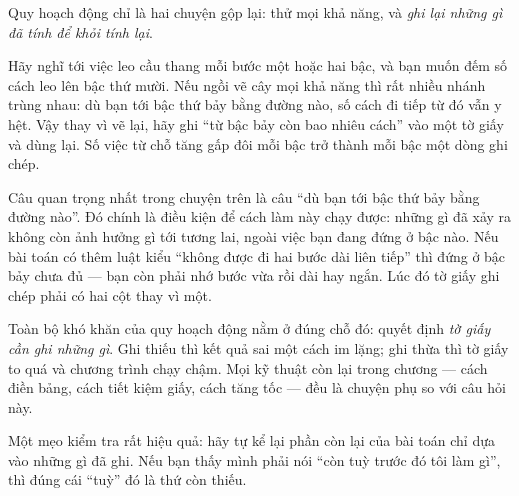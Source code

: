 \documentclass[../../algorithm.tex]{subfiles}
\begin{document}
\begin{dongian}
Quy hoạch động chỉ là hai chuyện gộp lại: thử mọi khả năng, và \emph{ghi lại những gì đã tính để khỏi tính lại}.

Hãy nghĩ tới việc leo cầu thang mỗi bước một hoặc hai bậc, và bạn muốn đếm số cách leo lên bậc thứ mười. Nếu ngồi vẽ cây mọi khả năng thì rất nhiều nhánh trùng nhau: dù bạn tới bậc thứ bảy bằng đường nào, số cách đi tiếp từ đó vẫn y hệt. Vậy thay vì vẽ lại, hãy ghi ``từ bậc bảy còn bao nhiêu cách'' vào một tờ giấy và dùng lại. Số việc từ chỗ tăng gấp đôi mỗi bậc trở thành mỗi bậc một dòng ghi chép.

Câu quan trọng nhất trong chuyện trên là câu ``dù bạn tới bậc thứ bảy bằng đường nào''. Đó chính là điều kiện để cách làm này chạy được: những gì đã xảy ra không còn ảnh hưởng gì tới tương lai, ngoài việc bạn đang đứng ở bậc nào. Nếu bài toán có thêm luật kiểu ``không được đi hai bước dài liên tiếp'' thì đứng ở bậc bảy chưa đủ --- bạn còn phải nhớ bước vừa rồi dài hay ngắn. Lúc đó tờ giấy ghi chép phải có hai cột thay vì một.

Toàn bộ khó khăn của quy hoạch động nằm ở đúng chỗ đó: quyết định \emph{tờ giấy cần ghi những gì}. Ghi thiếu thì kết quả sai một cách im lặng; ghi thừa thì tờ giấy to quá và chương trình chạy chậm. Mọi kỹ thuật còn lại trong chương --- cách điền bảng, cách tiết kiệm giấy, cách tăng tốc --- đều là chuyện phụ so với câu hỏi này.

Một mẹo kiểm tra rất hiệu quả: hãy tự kể lại phần còn lại của bài toán chỉ dựa vào những gì đã ghi. Nếu bạn thấy mình phải nói ``còn tuỳ trước đó tôi làm gì'', thì đúng cái ``tuỳ'' đó là thứ còn thiếu.
\end{dongian}
\end{document}
